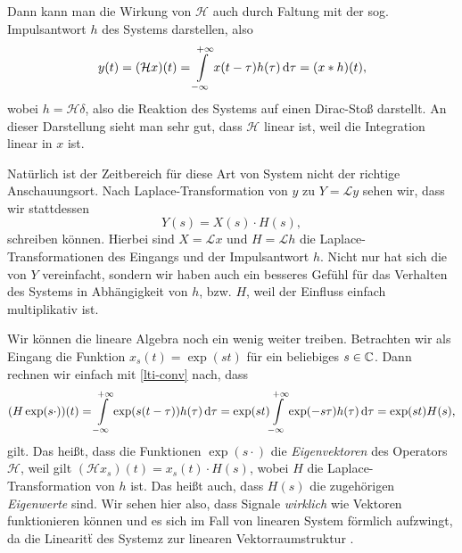 Dann kann man die Wirkung von $\mathcal{H}$ auch durch Faltung mit der sog. Impulsantwort $h$ des Systems darstellen, also
%
\begin{equation}\label{lti-conv}
    y(t) 
        = (\mathcal{H}x)(t) 
        = {\int\limits_{-\infty}^{+\infty}{x(t - \tau) h(\tau)}\,\mathrm{d}{\tau}} 
        = (x \ast h)(t),
\end{equation}
%
wobei $h = \mathcal{H}\delta$, also die Reaktion des Systems auf einen Dirac-Sto\ss{} darstellt.
An dieser Darstellung sieht man sehr gut, dass $\mathcal{H}$ linear ist, weil die Integration linear in $x$ ist.

Nat\"urlich ist der Zeitbereich f\"ur diese Art von System nicht der richtige Anschauungsort. 
Nach Laplace-Transformation von $y$ zu $Y = \mathcal{L}y$ sehen wir, dass wir stattdessen 
\[
Y(s) = X(s) \cdot H(s),
\]
schreiben k\"onnen. 
Hierbei sind $X = \mathcal{L}x$ und $H = \mathcal{L}h$ die Laplace-Transformationen des Eingangs und der Impulsantwort $h$.
Nicht nur hat sich die  von $Y$ vereinfacht, sondern wir haben auch ein besseres Gef\"uhl f\"ur das Verhalten des Systems in Abh\"angigkeit von $h$, bzw. $H$, weil der Einfluss einfach multiplikativ ist.

Wir k\"onnen die lineare Algebra noch ein wenig weiter treiben. Betrachten wir als Eingang die Funktion $x_s(t) = \exp(s t)$ f\"ur ein beliebiges $s \in \mathbb{C}$.
Dann rechnen wir einfach mit \eqref{lti-conv} nach, dass
\[
(H\exp(s\cdot))(t) 
    = {\int\limits_{-\infty}^{+\infty}{\exp(s (t-\tau))h(\tau)}\,\mathrm{d}{\tau}}
    = \exp(s t) {\int\limits_{-\infty}^{+\infty}{\exp(-s\tau)h(\tau)}\,\mathrm{d}{\tau}}
    = \exp(s t) H(s),
\]
gilt. Das hei\ss{}t, dass die Funktionen $\exp(s \cdot)$ die \emph{Eigenvektoren} des Operators $\mathcal{H}$, weil gilt $(\mathcal{H} x_s)(t) = x_s(t) \cdot H(s)$, wobei $H$ die Laplace-Transformation von $h$ ist.
Das hei\ss{}t auch, dass $H(s)$ die zugeh\"origen \emph{Eigenwerte} sind.
Wir sehen hier also, dass Signale \emph{wirklich} wie Vektoren funktionieren k\"onnen und es sich im Fall von linearen System f\"ormlich aufzwingt, da die Linearit\"t des Systemz zur linearen Vektorraumstruktur .